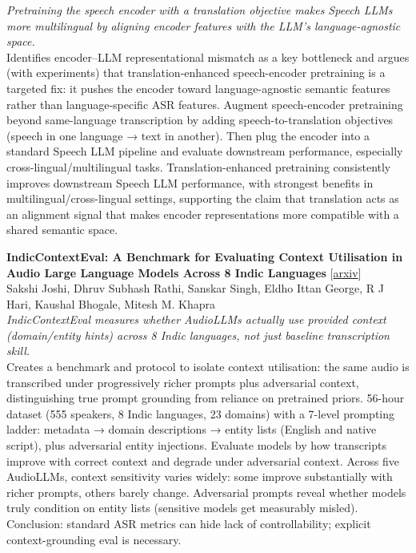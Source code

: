 \documentclass[12pt,letterpaper]{article}
\begin{document}
{\small\textit{Pretraining the speech encoder with a translation objective makes Speech LLMs more multilingual by aligning encoder features with the LLM's language-agnostic space.}}\\[1pt]
{\footnotesize Identifies encoder--LLM representational mismatch as a key bottleneck and argues (with experiments) that translation-enhanced speech-encoder pretraining is a targeted fix: it pushes the encoder toward language-agnostic semantic features rather than language-specific ASR features. Augment speech-encoder pretraining beyond same-language transcription by adding speech-to-translation objectives (speech in one language → text in another). Then plug the encoder into a standard Speech LLM pipeline and evaluate downstream performance, especially cross-lingual/multilingual tasks. Translation-enhanced pretraining consistently improves downstream Speech LLM performance, with strongest benefits in multilingual/cross-lingual settings, supporting the claim that translation acts as an alignment signal that makes encoder representations more compatible with a shared semantic space.}

\medskip

{\small\textbf{IndicContextEval: A Benchmark for Evaluating Context Utilisation in Audio Large Language Models Across 8 Indic Languages}} {\scriptsize[\href{https://arxiv.org/abs/2606.19157}{arxiv}]}\\
{\scriptsize Sakshi Joshi, Dhruv Subhash Rathi, Sanskar Singh, Eldho Ittan George, R J Hari, Kaushal Bhogale, Mitesh M. Khapra}\\

{\small\textit{IndicContextEval measures whether AudioLLMs actually use provided context (domain/entity hints) across 8 Indic languages, not just baseline transcription skill.}}\\[1pt]
{\footnotesize Creates a benchmark and protocol to isolate context utilisation: the same audio is transcribed under progressively richer prompts plus adversarial context, distinguishing true prompt grounding from reliance on pretrained priors. 56-hour dataset (555 speakers, 8 Indic languages, 23 domains) with a 7-level prompting ladder: metadata → domain descriptions → entity lists (English and native script), plus adversarial entity injections. Evaluate models by how transcripts improve with correct context and degrade under adversarial context. Across five AudioLLMs, context sensitivity varies widely: some improve substantially with richer prompts, others barely change. Adversarial prompts reveal whether models truly condition on entity lists (sensitive models get measurably misled). Conclusion: standard ASR metrics can hide lack of controllability; explicit context-grounding eval is necessary.}
\end{document}
